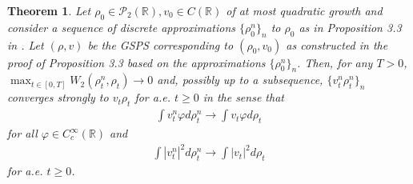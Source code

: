 \documentclass[11pt]{article}
\newtheorem{theorem}{Theorem}[section]
\numberwithin{equation}{section}
\begin{document}
        \begin{theorem} Let $\rho_0\in\mathcal{P}_2(\mathbb{R}), v_0\in C(\mathbb{R})$ of at most quadratic growth and consider a sequence of discrete approximations $\{\rho_0^n\}_n$ to $\rho_0$ as in Proposition 3.3 in \cite{Tudorascu-2008}. Let $(\rho,v)$ be the GSPS corresponding to $(\rho_0,v_0)$ as constructed in the proof of Proposition 3.3 \cite{Tudorascu-2008} based on the approximations $\{\rho_0^n\}_n$.  Then, for any $T>0$, $\max_{t\in[0,T]}W_2(\rho_t^n,\rho_t)\to0$ and, possibly up to a subsequence, $\{v_t^{n}\rho_t^{n}\}_n$ converges strongly to $v_t\rho_t$ for a.e. $t\geq0$ in the sense that 
            \begin{align}
                \int v_t^n\varphi d\rho_t^n\to\int v_t\varphi d\rho_t
            \end{align}
            for all $\varphi\in C_c^{\infty}(\mathbb{R})$ and
            \begin{align}
                \int|v_t^n|^2d\rho_t^n\to\int|v_t|^2d\rho_t
            \end{align}
            for a.e. $t\geq0$. 
        \end{theorem}
\end{document}
